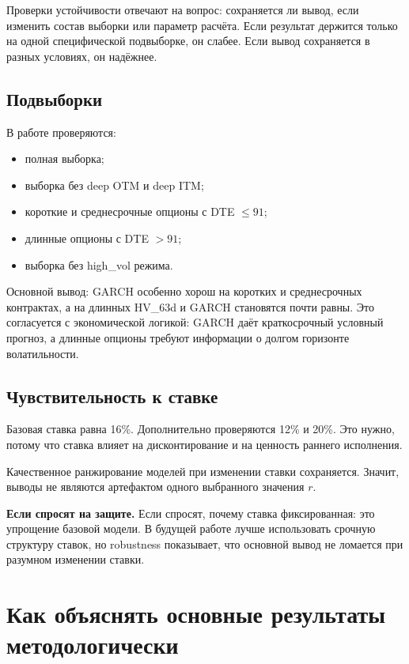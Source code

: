 \documentclass[11pt,a4paper]{article}
\newcommand{\answer}[1]{%
  \vspace{0.15em}
  \noindent\colorbox{softgreen}{%
    \parbox{\dimexpr\linewidth-2\fboxsep\relax}{\textbf{Если спросят на защите.} #1}%
  }\vspace{0.2em}
}
\begin{document}
Проверки устойчивости отвечают на вопрос: сохраняется ли вывод, если изменить состав выборки или параметр расчёта. Если результат держится только на одной специфической подвыборке, он слабее. Если вывод сохраняется в разных условиях, он надёжнее.

\subsection{Подвыборки}

В работе проверяются:

\begin{itemize}
    \item полная выборка;
    \item выборка без deep OTM и deep ITM;
    \item короткие и среднесрочные опционы с DTE $\leq 91$;
    \item длинные опционы с DTE $>91$;
    \item выборка без high\_vol режима.
\end{itemize}

Основной вывод: GARCH особенно хорош на коротких и среднесрочных контрактах, а на длинных HV\_63d и GARCH становятся почти равны. Это согласуется с экономической логикой: GARCH даёт краткосрочный условный прогноз, а длинные опционы требуют информации о долгом горизонте волатильности.

\subsection{Чувствительность к ставке}

Базовая ставка равна 16\%. Дополнительно проверяются 12\% и 20\%. Это нужно, потому что ставка влияет на дисконтирование и на ценность раннего исполнения.

Качественное ранжирование моделей при изменении ставки сохраняется. Значит, выводы не являются артефактом одного выбранного значения $r$.

\answer{Если спросят, почему ставка фиксированная: это упрощение базовой модели. В будущей работе лучше использовать срочную структуру ставок, но robustness показывает, что основной вывод не ломается при разумном изменении ставки.}

\section{Как объяснять основные результаты методологически}
\end{document}

